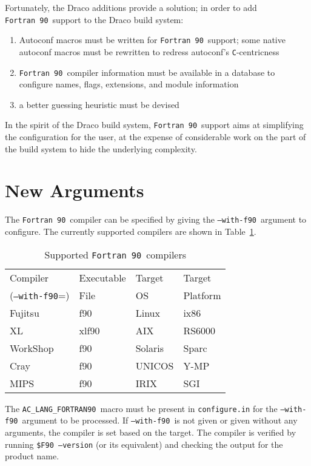 \documentclass[11pt]{nmemo}
\newcommand{\fninety}{\texttt{Fortran~90}}
\newcommand{\withfninety}{\texttt{--with-f90}}
\newcommand{\langfninety}{\texttt{AC\_LANG\_FORTRAN90}}
\begin{document}
Fortunately, the Draco additions provide a solution; in order to add
\fninety\ support to the Draco build system: 
\begin{enumerate}
\item Autoconf macros must be written for \fninety\ support; some
native autoconf macros must be rewritten to redress autoconf's
\texttt{C}-centricness  
\item \fninety\ compiler information must be available in a database
to configure names, flags, extensions, and module information
\item a better guessing heuristic must be devised
\end{enumerate}

In the spirit of the Draco build system, \fninety\ support aims at
simplifying the configuration for the user, at the expense of
considerable work on the part of the build system to hide the
underlying complexity.

\section{New Arguments}

The \fninety\ compiler can be specified by giving the \withfninety\ 
argument to configure.  The currently supported compilers are shown in
Table~\ref{tbl:compilers}.
\begin{table}[htb]
\hrulefill
\begin{center}
\caption{Supported \fninety\ compilers}\label{tbl:compilers}
\begin{tabular}{l|l|l|l}
Compiler        & Executable & Target  & Target \\
(\withfninety=) & File       & OS      & Platform \\ \hline
Fujitsu         & f90        & Linux   & ix86 \\
XL	        & xlf90      & AIX     & RS6000 \\
WorkShop        & f90	     & Solaris & Sparc \\
Cray            & f90        & UNICOS  & Y-MP \\
MIPS            & f90        & IRIX    & SGI  
\end{tabular}
\end{center}
\hrulefill
\end{table}
The \langfninety\ macro must be present in \texttt{configure.in} for
the \withfninety\ argument to be processed.  If \withfninety\ is not
given or given without any arguments, the compiler is set based on the
target.  The compiler is verified by running \texttt{\$F90 --version}
(or its equivalent) and checking the output for the product name.
\end{document}
